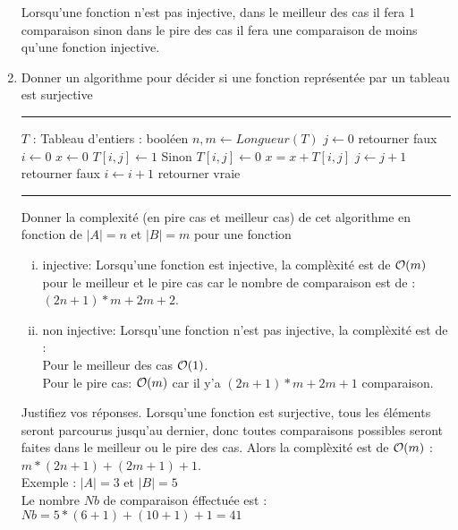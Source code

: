 \begin{enumerate}[1)]
\begin{framed}
Lorsqu'une fonction n'est pas injective, dans le meilleur des cas il fera 1 comparaison sinon dans le pire des cas il fera une comparaison de moins qu'une fonction injective.
\end{framed}

\newpage
\item{} Donner un algorithme pour d\'ecider si une fonction repr\'esent\'ee par un tableau est surjective
\begin{framed}

\rule{0.8\textwidth}{0.4mm}
            \begin{algorithmic}[1]
                 {$T$ : Tableau d'entiers} : bool\'een
                    \State $n,m \gets Longueur(T)$
                    \State $j \gets 0 $
                     retourner faux
                    \EndIf
                       \State $i \gets 0$
                       \State $x \gets 0 $
                            $T[i,j] \gets 1$ 
                            \State Sinon $T[i,j] \gets 0$
                           \EndIf
                           \State $x = x + T[i,j]$
                           \State $j \gets j+1$
                        \EndWhile
                         retourner faux
                        \EndIf
                        \State $i \gets i+1$
                    \EndWhile
                    \State retourner vraie
                \EndFunction
            \end{algorithmic}
\rule{0.8\textwidth}{0.4mm}

\vspace{.5cm}
Donner la complexit\'e (en pire cas et meilleur cas) de cet algorithme en fonction de $|A|=n$ et $|B|=m$ pour une fonction
\begin{enumerate}[(i)]
\item injective:
Lorsqu'une fonction est injective, la complèxité est de  ${\cal O}(m)$ pour le meilleur et le pire cas car le nombre de comparaison est de :\\
$(2n+1)*m+2m+2$.\\
\item non injective: 
Lorsqu'une fonction n'est pas injective, la complèxité est de :\\
Pour le meilleur des cas  ${\cal O}(1)$.\\
Pour le pire cas: ${\cal O}(m)$ car il y'a $(2n+1)*m+2m+1$ comparaison.\\
\end{enumerate}
Justifiez vos r\'eponses.
Lorsqu'une fonction est surjective, tous les éléments seront parcourus jusqu'au dernier, donc toutes comparaisons possibles seront faites dans le meilleur ou le pire des cas. Alors la complèxité est de ${\cal O}(m)$ :\\
$m*(2n+1)+(2m+1)+1$.\\
Exemple : $|A|=3$ et $|B|=5$ \\
Le nombre $Nb$ de comparaison éffectuée est : \\
$Nb = 5*(6+1)+(10+1)+1 = 41$


\end{framed}
\end{enumerate}
